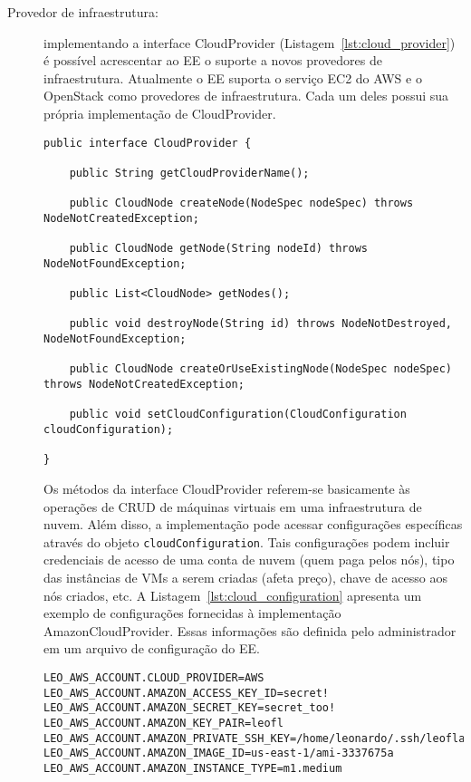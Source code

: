 \begin{description}

\item [Provedor de infraestrutura:] implementando a interface \textsf{CloudProvider} (Listagem~\ref{lst:cloud_provider}) 
é possível acrescentar ao EE o suporte a novos provedores de infraestrutura. 
Atualmente o EE suporta o serviço EC2 do AWS e o OpenStack como provedores de infraestrutura.
Cada um deles possui sua própria implementação de \textsf{CloudProvider}.

\begin{lstlisting}[frame=trbl, label=lst:cloud_provider, caption=Interface CloudProvider.]
public interface CloudProvider {

    public String getCloudProviderName();

    public CloudNode createNode(NodeSpec nodeSpec) throws NodeNotCreatedException;

    public CloudNode getNode(String nodeId) throws NodeNotFoundException;

    public List<CloudNode> getNodes();

    public void destroyNode(String id) throws NodeNotDestroyed, NodeNotFoundException;

    public CloudNode createOrUseExistingNode(NodeSpec nodeSpec) throws NodeNotCreatedException;

    public void setCloudConfiguration(CloudConfiguration cloudConfiguration);

}
\end{lstlisting}

Os métodos da interface \textsf{CloudProvider} referem-se basicamente às operações de CRUD de máquinas virtuais
em uma infraestrutura de nuvem. Além disso, a implementação pode acessar configurações específicas 
através do objeto \texttt{cloudConfiguration}. Tais configurações podem incluir 
credenciais de acesso de uma conta de nuvem (quem paga pelos nós), tipo das instâncias de VMs a serem criadas (afeta preço),
chave de acesso aos nós criados, etc. A Listagem~\ref{lst:cloud_configuration} apresenta um exemplo de configurações
fornecidas à implementação \textsf{AmazonCloudProvider}. 
Essas informações são definida pelo administrador em um arquivo de configuração do EE.

\begin{lstlisting}[frame=trbl, label=lst:cloud_configuration, caption=Configuração do \textsf{AmazonCloudProvider}.]
LEO_AWS_ACCOUNT.CLOUD_PROVIDER=AWS
LEO_AWS_ACCOUNT.AMAZON_ACCESS_KEY_ID=secret!
LEO_AWS_ACCOUNT.AMAZON_SECRET_KEY=secret_too!
LEO_AWS_ACCOUNT.AMAZON_KEY_PAIR=leofl
LEO_AWS_ACCOUNT.AMAZON_PRIVATE_SSH_KEY=/home/leonardo/.ssh/leoflaws.pem
LEO_AWS_ACCOUNT.AMAZON_IMAGE_ID=us-east-1/ami-3337675a
LEO_AWS_ACCOUNT.AMAZON_INSTANCE_TYPE=m1.medium
\end{lstlisting}
 

\end{description}
